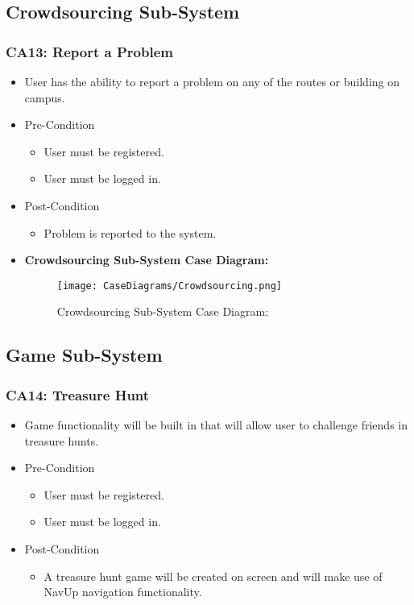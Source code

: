 \documentclass[12pt,a4paper]{article}
\begin{document}
	\subsection{Crowdsourcing Sub-System}
		\subsubsection{CA13: Report a Problem}
			\begin{itemize}
				\item User has the ability to report a problem on any of the routes or building on campus.
				\item Pre-Condition
					\begin{itemize}
						\item User must be registered.
						\item User must be logged in.
					\end{itemize}
				\item Post-Condition
					\begin{itemize}
						\item Problem is reported to the system.
					\end{itemize}
				\item \textbf{Crowdsourcing Sub-System Case Diagram:}
				\begin{figure}[H]
					\texttt{[image: CaseDiagrams/Crowdsourcing.png]}
					\caption{Crowdsourcing Sub-System Case Diagram:}
				\end{figure}
			\end{itemize}
	\subsection{Game Sub-System}
		\subsubsection{CA14: Treasure Hunt}
			\begin{itemize}
				\item Game functionality will be built in that will allow user to challenge friends in treasure hunts.
				\item Pre-Condition
					\begin{itemize}
						\item User must be registered.
						\item User must be logged in.
					\end{itemize}
				\item Post-Condition
					\begin{itemize}
						\item A treasure hunt game will be created on screen and will make use of NavUp navigation functionality.
					\end{itemize}
			\end{itemize}
\end{document}
